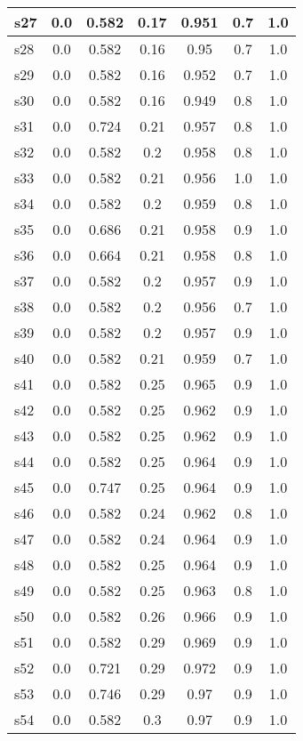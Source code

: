 \documentclass{article}
\begin{document}
\begin{tabular}{|l|c|c|c|c|c|c|}
\hline
s27 &0.0 & 0.582 & 0.17 & 0.951 & 0.7 & 1.0\\
\hline
s28 &0.0 & 0.582 & 0.16 & 0.95 & 0.7 & 1.0\\
\hline
s29 &0.0 & 0.582 & 0.16 & 0.952 & 0.7 & 1.0\\
\hline
s30 &0.0 & 0.582 & 0.16 & 0.949 & 0.8 & 1.0\\
\hline
s31 &0.0 & 0.724 & 0.21 & 0.957 & 0.8 & 1.0\\
\hline
s32 &0.0 & 0.582 & 0.2 & 0.958 & 0.8 & 1.0\\
\hline
s33 &0.0 & 0.582 & 0.21 & 0.956 & 1.0 & 1.0\\
\hline
s34 &0.0 & 0.582 & 0.2 & 0.959 & 0.8 & 1.0\\
\hline
s35 &0.0 & 0.686 & 0.21 & 0.958 & 0.9 & 1.0\\
\hline
s36 &0.0 & 0.664 & 0.21 & 0.958 & 0.8 & 1.0\\
\hline
s37 &0.0 & 0.582 & 0.2 & 0.957 & 0.9 & 1.0\\
\hline
s38 &0.0 & 0.582 & 0.2 & 0.956 & 0.7 & 1.0\\
\hline
s39 &0.0 & 0.582 & 0.2 & 0.957 & 0.9 & 1.0\\
\hline
s40 &0.0 & 0.582 & 0.21 & 0.959 & 0.7 & 1.0\\
\hline
s41 &0.0 & 0.582 & 0.25 & 0.965 & 0.9 & 1.0\\
\hline
s42 &0.0 & 0.582 & 0.25 & 0.962 & 0.9 & 1.0\\
\hline
s43 &0.0 & 0.582 & 0.25 & 0.962 & 0.9 & 1.0\\
\hline
s44 &0.0 & 0.582 & 0.25 & 0.964 & 0.9 & 1.0\\
\hline
s45 &0.0 & 0.747 & 0.25 & 0.964 & 0.9 & 1.0\\
\hline
s46 &0.0 & 0.582 & 0.24 & 0.962 & 0.8 & 1.0\\
\hline
s47 &0.0 & 0.582 & 0.24 & 0.964 & 0.9 & 1.0\\
\hline
s48 &0.0 & 0.582 & 0.25 & 0.964 & 0.9 & 1.0\\
\hline
s49 &0.0 & 0.582 & 0.25 & 0.963 & 0.8 & 1.0\\
\hline
s50 &0.0 & 0.582 & 0.26 & 0.966 & 0.9 & 1.0\\
\hline
s51 &0.0 & 0.582 & 0.29 & 0.969 & 0.9 & 1.0\\
\hline
s52 &0.0 & 0.721 & 0.29 & 0.972 & 0.9 & 1.0\\
\hline
s53 &0.0 & 0.746 & 0.29 & 0.97 & 0.9 & 1.0\\
\hline
s54 &0.0 & 0.582 & 0.3 & 0.97 & 0.9 & 1.0\\
\hline

\end{tabular}
\end{document}
